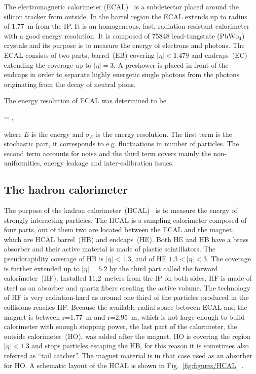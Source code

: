 The electromagnetic calorimeter (ECAL)~\cite{tdrECAL} is a subdetector placed around the silicon tracker from outside. In the barrel region the ECAL extends up to radius of 1.77~m from the IP. It is an homogeneous, fast, radiation resistant calorimeter with a good energy resolution. It is composed of 75848 lead-tungstate ($\mathrm{PbWo_{4}}$) crystals and its purpose is to measure the energy of electrons and photons. The ECAL consists of two parts, barrel~(EB) covering $|\eta|<1.479$ and endcaps~(EC) extending the coverage up to $|\eta| =3$. A preshower is placed in front of the endcaps in order to separate highly energetic single photons from the photons originating from the decay of neutral pions.

The energy resolution of ECAL was determined to be

{
  =  \bigoplus {}  ,
}

where $E$ is the energy and $\sigma_{E}$ is the energy resolution. The first term is the stochastic part, it corresponds to e.g. fluctuations in number of particles. The second term accounts for noise and the third term covers mainly the non-uniformities, energy leakage and inter-calibration issues.


\subsection{The hadron calorimeter}

The purpose of the hadron calorimeter~(HCAL)~\cite{tdrHCAL} is to measure the energy of strongly interacting particles.  The HCAL is a sampling calorimeter composed of four parts, out of them two are located between the ECAL and the magnet, which are HCAL barrel~(HB) and endcaps~(HE). Both HE and HB have a brass absorber and their active material is made of plastic scintillators. The pseudorapidity coverage of HB is $|\eta|<1.3$, and of HE $1.3<|\eta|<3$. The coverage is further extended up to $|\eta|=5.2$ by the third part called the forward calorimeter~(HF). Installed 11.2~meters from the IP on both sides, HF is made of steel as an absorber and quartz fibers creating the active volume. The technology of HF is very radiation-hard as around one third of the particles produced in the collisions reaches HF. Because the available radial space between ECAL and the magnet is between r=1.77~m and r=2.95~m, which is not large enough to build calorimeter with enough stopping power, the last part of the calorimeter, the outside calorimeter~(HO), was added after the magnet. HO is covering the region $|\eta|<1.3$ and stops particles escaping the HB, for this reason it is sometimes also referred as ``tail catcher''. The magnet material is in that case used as an absorber for HO. A schematic layout of the HCAL is shown in Fig.~\ref{fig:figures/HCAL}~\cite{Chatrchyan:2008aa}.

